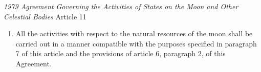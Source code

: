 \begin{conventiondetails}{\textit{1979 Agreement Governing the Activities of States on the Moon and Other Celestial Bodies} Article 11}
\begin{enumerate}
        \begin{enumerate}[label=(\alph*)]
            \item The orderly and safe development of the natural resources of the moon;
            \item The rational management of those resources;
            \item The expansion of opportunities in the use of those resources;
            \item An equitable sharing by all States Parties in the benefits derived from those resources, whereby the interests and needs of the developing countries, as well as the efforts of those countries which have contributed either directly or indirectly to the exploration of the moon, shall be given special consideration.
        \end{enumerate}
        \item All the activities with respect to the natural resources of the moon shall be carried out in a manner compatible with the purposes specified in paragraph 7 of this article and the provisions of article 6, paragraph 2, of this Agreement.
    \end{enumerate}
\end{conventiondetails}
